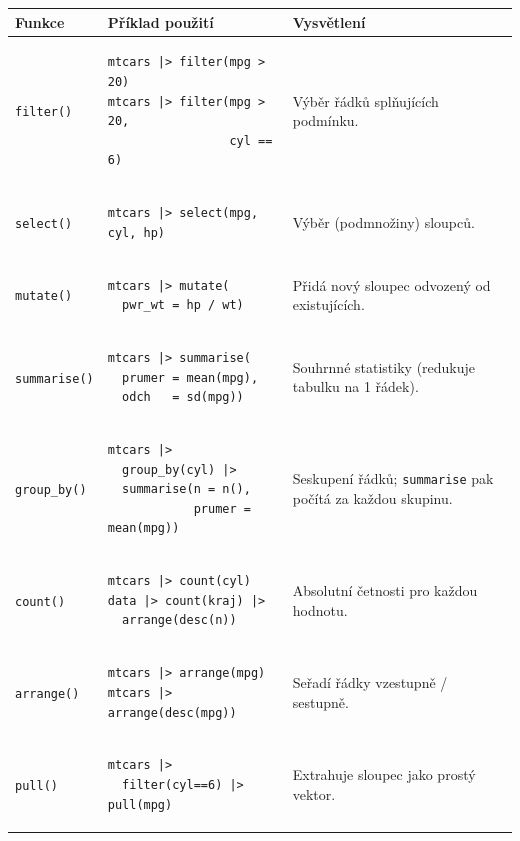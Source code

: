 \documentclass[a4paper, 11pt]{article}
\newenvironment{funkcedict}
{%
  \begingroup
  \renewcommand{\arraystretch}{1.4}%
  \lstset{basicstyle=\ttfamily\small, columns=fullflexible}%
  \setlength{\tabcolsep}{4pt}%
  \begin{tabular}{p{0.19\textwidth} p{0.38\textwidth} p{0.30\textwidth}}
  \textbf{Funkce} & \textbf{Příklad použití} & \textbf{Vysvětlení} \\
  \midrule
}
{%
  \end{tabular}%
  \endgroup
}
\begin{document}
			\begin{funkcedict}
				\texttt{filter()} &
				\begin{lstlisting}
mtcars |> filter(mpg > 20)
mtcars |> filter(mpg > 20,
                 cyl == 6)
				\end{lstlisting}
				& Výběr řádků splňujících podmínku. \\
				\texttt{select()} &
				\begin{lstlisting}
mtcars |> select(mpg, cyl, hp)
				\end{lstlisting}
				& Výběr (podmnožiny) sloupců. \\
				\texttt{mutate()} &
				\begin{lstlisting}
mtcars |> mutate(
  pwr_wt = hp / wt)
				\end{lstlisting}
				& Přidá nový sloupec odvozený od existujících. \\
				\texttt{summarise()} &
				\begin{lstlisting}
mtcars |> summarise(
  prumer = mean(mpg),
  odch   = sd(mpg))
				\end{lstlisting}
				& Souhrnné statistiky (redukuje tabulku na 1 řádek). \\
				\texttt{group\_by()} &
				\begin{lstlisting}
mtcars |>
  group_by(cyl) |>
  summarise(n = n(),
            prumer = mean(mpg))
				\end{lstlisting}
				& Seskupení řádků; \texttt{summarise} pak počítá za každou skupinu. \\
				\texttt{count()} &
				\begin{lstlisting}
mtcars |> count(cyl)
data |> count(kraj) |>
  arrange(desc(n))
				\end{lstlisting}
				& Absolutní četnosti pro každou hodnotu. \\
				\texttt{arrange()} &
				\begin{lstlisting}
mtcars |> arrange(mpg)
mtcars |> arrange(desc(mpg))
				\end{lstlisting}
				& Seřadí řádky vzestupně / sestupně. \\
				\texttt{pull()} &
				\begin{lstlisting}
mtcars |>
  filter(cyl==6) |> pull(mpg)
				\end{lstlisting}
				& Extrahuje sloupec jako prostý vektor. \\
			\end{funkcedict}
\end{document}
